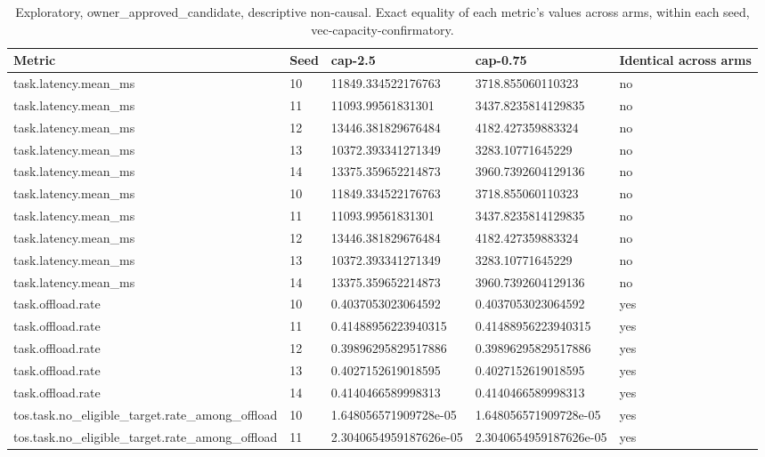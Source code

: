 {
\begin{table}[htbp]
\centering
\caption{Exploratory, owner\_approved\_candidate, descriptive non-causal. Exact equality of each metric's values across arms, within each seed, vec-capacity-confirmatory.}
\label{tab:traffictwin-metrics-3e4c897ae72a}
\small
\renewcommand{\arraystretch}{1.15}
\begin{tabular}{lllll}
\hline
Metric & Seed & cap-2.5 & cap-0.75 & Identical across arms \\
\hline
task.latency.mean\_ms & 10 & 11849.334522176763 & 3718.855060110323 & no \\
task.latency.mean\_ms & 11 & 11093.99561831301 & 3437.8235814129835 & no \\
task.latency.mean\_ms & 12 & 13446.381829676484 & 4182.427359883324 & no \\
task.latency.mean\_ms & 13 & 10372.393341271349 & 3283.10771645229 & no \\
task.latency.mean\_ms & 14 & 13375.359652214873 & 3960.7392604129136 & no \\
task.latency.mean\_ms & 10 & 11849.334522176763 & 3718.855060110323 & no \\
task.latency.mean\_ms & 11 & 11093.99561831301 & 3437.8235814129835 & no \\
task.latency.mean\_ms & 12 & 13446.381829676484 & 4182.427359883324 & no \\
task.latency.mean\_ms & 13 & 10372.393341271349 & 3283.10771645229 & no \\
task.latency.mean\_ms & 14 & 13375.359652214873 & 3960.7392604129136 & no \\
task.offload.rate & 10 & 0.4037053023064592 & 0.4037053023064592 & yes \\
task.offload.rate & 11 & 0.41488956223940315 & 0.41488956223940315 & yes \\
task.offload.rate & 12 & 0.39896295829517886 & 0.39896295829517886 & yes \\
task.offload.rate & 13 & 0.4027152619018595 & 0.4027152619018595 & yes \\
task.offload.rate & 14 & 0.4140466589998313 & 0.4140466589998313 & yes \\
tos.task.no\_eligible\_target.rate\_among\_offload & 10 & 1.648056571909728e-05 & 1.648056571909728e-05 & yes \\
tos.task.no\_eligible\_target.rate\_among\_offload & 11 & 2.3040654959187626e-05 & 2.3040654959187626e-05 & yes \\

\end{tabular}
\end{table}}
